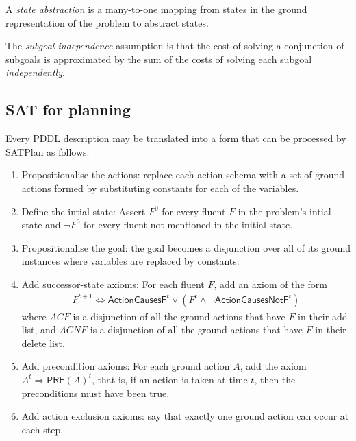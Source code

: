 \documentclass{article}
\begin{document}
\begin{definition}
    A \emph{state abstraction} is a many-to-one mapping from states in the ground
    representation of the problem to abstract states.
\end{definition}

\begin{definition}
    The \emph{subgoal independence} assumption is that the cost of solving a conjunction
    of subgoals is approximated by the sum of the costs of solving each subgoal
    \emph{independently}.
\end{definition}

\subsection{SAT for planning}

\begin{theorem}
    Every PDDL description may be translated into a form that can be
    processed by SATPlan as follows:
    \begin{enumerate}
        \item Propositionalise the actions: replace each action schema with a set of ground actions
              formed by substituting constants for each of the variables.
        \item Define the intial state: Assert $F^0$ for every fluent $F$ in the problem's intial state
              and $\neg F^0$ for every fluent not mentioned in the initial state.
        \item Propositionalise the goal: the goal becomes a disjunction over all of its ground instances
              where variables are replaced by constants.
        \item Add successor-state axioms: For each fluent $F$, add an axiom of the form \begin{align*}
                  F^{t+1} \Leftrightarrow \textsf{ActionCausesF}^t \vee (F^t \wedge \neg \textsf{ActionCausesNotF}^t)
              \end{align*}
              where $ACF$ is a disjunction of all the ground actions that have $F$ in
              their add list, and $ACNF$ is a disjunction of all the ground actions that have $F$
              in their delete list.
        \item Add precondition axioms: For each ground action $A$, add the axiom $A^t\Rightarrow\textsf{PRE}(A)^t$,
              that is, if an action is taken at time $t$, then the preconditions must have been true.
        \item Add action exclusion axioms: say that exactly one ground action can occur at each step.
    \end{enumerate}
\end{theorem}
\end{document}

